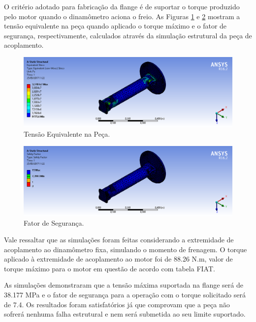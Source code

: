 O critério adotado para fabricação da flange é de suportar o torque produzido pelo motor quando o dinamômetro aciona o freio. As Figuras \ref{fig:tesaoequivalente} e \ref{fig:fatorseguranca} mostram a tensão equivalente na peça quando aplicado o torque máximo e o fator de segurança, respectivamente, calculados através da simulação estrutural da peça de acoplamento.


\begin{figure}[h!]
	\centering
	\includegraphics[keepaspectratio=true,scale= 0.35]{figuras/Tensao_Equivalente.png}
	\caption{Tensão Equivalente na Peça.}
	\label{fig:tesaoequivalente}
\end{figure}

\begin{figure}[h!]
	\centering
	\includegraphics[keepaspectratio=true,scale= 0.33]{figuras/Fator_de_Seguranca.png}
	\caption{Fator de Segurança.}
	\label{fig:fatorseguranca}
\end{figure}

\vfill

Vale ressaltar que as simulações foram feitas considerando a extremidade de acoplamento ao dinamômetro fixa, simulando o momento de frenagem. O torque aplicado à extremidade de acoplamento ao motor foi de 88.26 N.m, valor de torque máximo para o motor em questão de acordo com  tabela FIAT.

As simulações demonstraram que a tensão máxima suportada na flange será de 38.177 MPa e o fator de segurança para a operação com o torque solicitado será de 7.4. Os resultados foram satisfatórios já que comprovam que a peça não sofrerá nenhuma falha estrutural e nem será submetida ao seu limite suportado.


